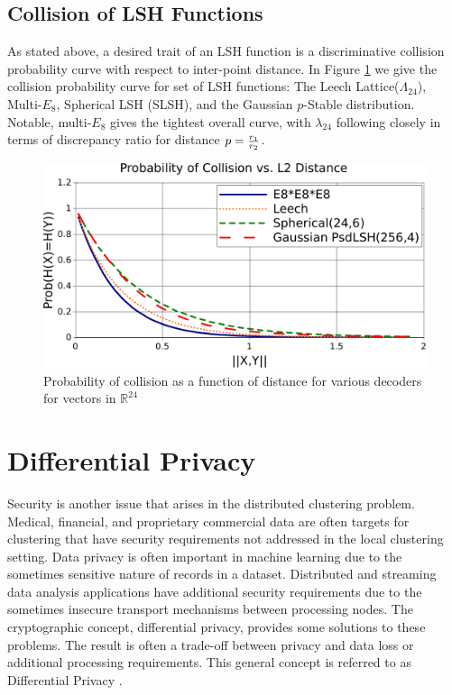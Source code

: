\subsection{Collision of LSH Functions}
As stated above, a desired trait of an LSH function is a discriminative collision probability curve with respect to
inter-point distance.  In Figure \ref{prcollision} we give the collision probability curve for set of LSH
functions: The Leech Lattice($\Lambda_{24}$), Multi-$E_8$, Spherical LSH (SLSH), and the Gaussian $p$-Stable distribution.  
Notable, multi-$E_8$ gives the tightest overall curve, with $\lambda_{24}$ following closely in terms of discrepancy ratio
for distance $p = {{r_1} \over {r_2}}$.

\begin{figure}
    \centerline{\includegraphics[width=.8\textwidth]{figs/prcollisions}}
    \caption{Probability of collision as a function of distance for various decoders for vectors in
      $\mathbb{R}^{24}$}\label{prcollision} 
\end{figure}

\section{Differential Privacy}

Security is another issue that arises in the distributed clustering problem.  Medical, financial, and proprietary
commercial data are often targets for clustering that have security requirements not addressed in the local clustering
setting.  Data privacy is often important in machine learning due to the sometimes sensitive nature of records in a
dataset.  Distributed and streaming data analysis applications have additional security requirements due to the
sometimes insecure transport mechanisms between processing nodes.  The cryptographic concept, differential privacy,
provides some solutions to these problems.  The result is often a trade-off between privacy and data loss or additional
processing requirements.  This general concept is referred to as Differential Privacy \cite{diffpriv}.

